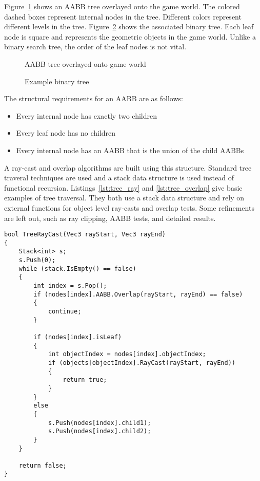 \documentclass{article}
\begin{document}
Figure~\ref{fig:overlay} shows an AABB tree overlayed onto the game world. The colored dashed boxes represent internal nodes in the tree. Different colors represent different levels in the tree. Figure~\ref{fig:example_tree} shows the associated binary tree. Each leaf node is square and represents the geometric objects in the game world. Unlike a binary search tree, the order of the leaf nodes is not vital.
\begin{figure}
	\begin{center}
		
	\end{center}
	\caption{AABB tree overlayed onto game world}
	\label{fig:overlay}
\end{figure}

\begin{figure}
	\begin{center}
		
	\end{center}
	\caption{Example binary tree}
	\label{fig:example_tree}
\end{figure}

The structural requirements for an AABB are as follows:
\begin{itemize}
	\item Every internal node has exactly two children
	\item Every leaf node has no children
	\item Every internal node has an AABB that is the union of the child AABBs
\end{itemize}

A ray-cast and overlap algorithms are built using this structure. Standard tree traveral techniques are used and a stack data structure is used instead of functional recursion. Listings~\ref{lst:tree_ray} and \ref{lst:tree_overlap} give basic examples of tree traversal. They both use a stack data structure and rely on external functions for object level ray-casts and overlap tests. Some refinements are left out, such as ray clipping, AABB tests, and detailed results.

\begin{lstlisting}[caption={Tree ray-cast}, label={lst:tree_ray}, float]
bool TreeRayCast(Vec3 rayStart, Vec3 rayEnd)
{
	Stack<int> s;
	s.Push(0);
	while (stack.IsEmpty() == false)
	{
		int index = s.Pop();
		if (nodes[index].AABB.Overlap(rayStart, rayEnd) == false)
		{
			continue;
		}

		if (nodes[index].isLeaf)
		{
			int objectIndex = nodes[index].objectIndex;
			if (objects[objectIndex].RayCast(rayStart, rayEnd))
			{
				return true;
			}
		}
		else
		{
			s.Push(nodes[index].child1);
			s.Push(nodes[index].child2);
		}
	}

	return false;
}
\end{lstlisting}
\end{document}
